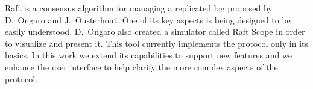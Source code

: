 Raft is a consensus algorithm for managing a replicated log proposed by D.~Ongaro and J.~Ousterhout.
One of its key aspects is being designed to be easily understood.
D.~Ongaro also created a simulator called Raft Scope in order to visualize and present it.
This tool currently implements the protocol only in its basics.
In this work we extend its capabilities to support new features
and we enhance the user interface to help clarify the more complex aspects of the protocol.
